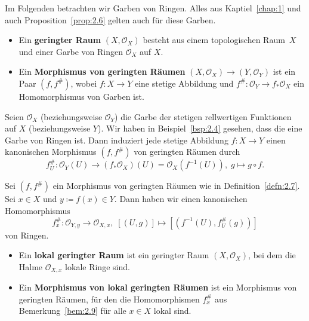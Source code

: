 Im Folgenden betrachten wir Garben von Ringen. Alles aus Kaptiel~\ref{chap:1} und auch Proposition~\ref{prop:2.6} gelten auch für diese Garben.

\begin{defn}
\label{defn:2.7}
	\begin{itemize}
		\item Ein \textbf{geringter Raum} $(X, \mathcal{O}_X)$ besteht aus einem topologischen Raum~$X$ und einer Garbe von Ringen $\mathcal{O}_X$ auf $X$.
		\item Ein \textbf{Morphismus von geringten Räumen} $(X, \mathcal{O}_X) \to (Y, \mathcal{O}_Y)$ ist ein Paar $(f, f^{\#})$, wobei $f\colon X \to Y$ eine stetige Abbildung und $f^{\#}\colon \mathcal{O}_Y \to f_*\mathcal{O}_X$ ein Homomorphismus von Garben ist.
	\end{itemize}
\end{defn}

\begin{bsp}
	Seien $\mathcal{O}_X$ (beziehungsweise $\mathcal{O}_Y$) die Garbe der stetigen rellwertigen Funktionen auf $X$ (beziehungsweise $Y$). Wir haben in Beispiel~\ref{bsp:2.4} gesehen, dass die eine Garbe von Ringen ist. Dann induziert jede stetige Abbildung $f\colon X \to Y$ einen kanonischen Morphismus $(f,f^{\#})$ von geringten Räumen durch
	\[
		f^{\#}_U\colon \mathcal{O}_Y(U) \to (f_*\mathcal{O}_X)(U) = \mathcal{O}_X(f^{-1}(U)),\; g \mapsto g \circ f.
	\]
\end{bsp}

\begin{bem}
\label{bem:2.9}
	Sei $(f,f^{\#})$ ein Morphismus von geringten Räumen wie in Definition~\ref{defn:2.7}. Sei $x \in X$ und $y \coloneqq f(x)\in Y$. Dann haben wir einen kanonischen Homomorphismus
	\[
		f_x^{\#}\colon \mathcal{O}_{Y,y} \to \mathcal{O}_{X,x},\; [(U,g)] \mapsto [(f^{-1}(U),f^{\#}_U(g))]
	\]
	von Ringen.
\end{bem}

\begin{defn}
	\begin{itemize}
		\item Ein \textbf{lokal geringter Raum} ist ein geringter Raum $(X,\mathcal{O}_X)$, bei dem die Halme $\mathcal{O}_{X,x}$ lokale Ringe sind.
		\item Ein \textbf{Morphismus von lokal geringten Räumen} ist ein Morphismus von geringten Räumen, für den die Homomorphismen $f_x^{\#}$ aus Bemerkung~\ref{bem:2.9} für alle $x \in X$ lokal sind.
	\end{itemize}
\end{defn}

